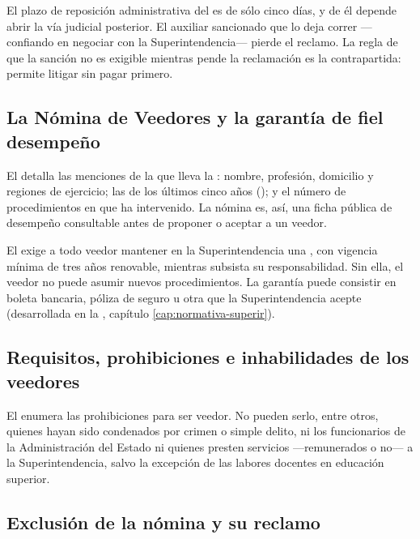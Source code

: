 \begin{alerta}
El plazo de reposición administrativa del  es de sólo cinco días, y de él depende abrir
la vía judicial posterior. El auxiliar sancionado que lo deja correr ---confiando en negociar con
la Superintendencia--- pierde el reclamo. La regla de que la sanción no es exigible mientras pende
la reclamación es la contrapartida: permite litigar sin pagar primero.
\end{alerta}

\subsection{La Nómina de Veedores y la garantía de fiel desempeño}

El  detalla las menciones de la  que lleva la \superir{}:
nombre, profesión, domicilio y regiones de ejercicio; las  de los últimos cinco años (); y el número de procedimientos en que ha
intervenido. La nómina es, así, una ficha pública de desempeño consultable antes de proponer o
aceptar a un veedor.

El  exige a todo veedor mantener en la Superintendencia una , con vigencia mínima de tres años renovable, mientras subsista su
responsabilidad. Sin ella, el veedor no puede asumir nuevos procedimientos. La garantía puede
consistir en boleta bancaria, póliza de seguro u otra que la Superintendencia acepte
(desarrollada en la , capítulo \ref{cap:normativa-superir}).

\subsection{Requisitos, prohibiciones e inhabilidades de los veedores}

El  enumera las prohibiciones para ser veedor. No pueden serlo, entre otros, quienes
hayan sido condenados por crimen o simple delito, ni los funcionarios de la Administración del
Estado ni quienes presten servicios ---remunerados o no--- a la Superintendencia, salvo la
excepción de las labores docentes en educación superior.

\subsection{Exclusión de la nómina y su reclamo}

